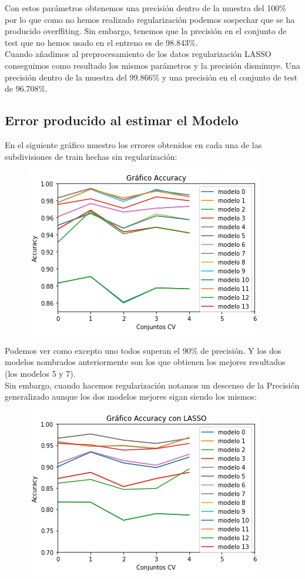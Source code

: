 \documentclass[a4paper,11pt]{article}
\begin{document}
Con estos parámetros obtenemos una precisión dentro de la muestra del 100$\%$ por lo que como no hemos realizado regularización podemos sospechar que se ha producido overffiting. Sin embargo, tenemos que la precisión en el conjunto de test que no hemos usado en el entreno es de 98.843$\%$.  \\

Cuando añadimos al preprocesamiento de los datos regularización LASSO conseguimos como resultado los mismos parámetros y la precisión disminuye. Una precisión dentro de la muestra del 99.866$\%$ y una precisión en el conjunto de test de 96.708$\%$.



\subsection{Error producido al estimar el Modelo}

En el siguiente gráfico muestro los errores obtenidos en cada una de las subdivisiones de train hechas sin regularización:
\newpage
\begin{figure}[h]
\includegraphics[scale=0.6]{errores}
\centering
\end{figure}

Podemos ver como excepto uno todos superan el 90$\%$ de precisión. Y los dos modelos nombrados anteriormente son los que obtienen los mejores resultados (los modelos 5 y 7).\\

Sin embargo, cuando hacemos regularización notamos un descenso de la Precisión generalizado aunque los dos modelos mejores sigan siendo los mismos:

\begin{figure}[h]
\includegraphics[scale=0.6]{erroresLasso}
\centering
\end{figure}
\end{document}
